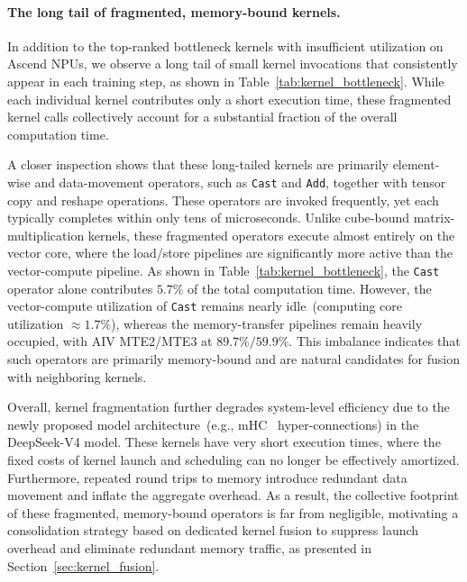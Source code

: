 \paragraph{The long tail of fragmented, memory-bound kernels.}
In addition to the top-ranked bottleneck kernels with insufficient utilization on Ascend NPUs, we observe a long tail of small kernel invocations that consistently appear in each training step, as shown in Table~\ref{tab:kernel_bottleneck}. While each individual kernel contributes only a short execution time, these fragmented kernel calls collectively account for a substantial fraction of the overall computation time.

A closer inspection shows that these long-tailed kernels are primarily element-wise and data-movement operators, such as \texttt{Cast} and \texttt{Add}, together with tensor copy and reshape operations. These operators are invoked frequently, yet each typically completes within only tens of microseconds. Unlike cube-bound matrix-multiplication kernels, these fragmented operators execute almost entirely on the vector core, where the load/store pipelines are significantly more active than the vector-compute pipeline. As shown in Table~\ref{tab:kernel_bottleneck}, the \texttt{Cast} operator alone contributes $5.7\%$ of the total computation time. However, the vector-compute utilization of \texttt{Cast} remains nearly idle~(computing core utilization $\approx 1.7\%$), whereas the memory-transfer pipelines remain heavily occupied, with AIV MTE2/MTE3 at $89.7\% / 59.9\%$. This imbalance indicates that such operators are primarily memory-bound and are natural candidates for fusion with neighboring kernels.

Overall, kernel fragmentation further degrades system-level efficiency due to the newly proposed model architecture~(e.g., mHC~\citep{mhc2025} hyper-connections) in the DeepSeek-V4 model. 
These kernels have very short execution times, where the fixed costs of kernel launch and scheduling can no longer be effectively amortized. 
Furthermore, repeated round trips to memory introduce redundant data movement and inflate the aggregate overhead. 
As a result, the collective footprint of these fragmented, memory-bound operators is far from negligible, motivating a consolidation strategy based on dedicated kernel fusion to suppress launch overhead and eliminate redundant memory traffic, as presented in Section~\ref{sec:kernel_fusion}. 


